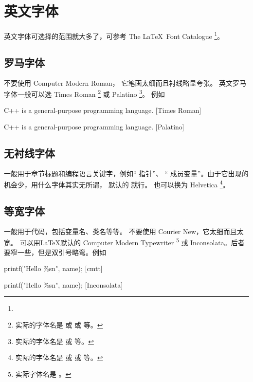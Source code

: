 \section{英文字体} %
英文字体可选择的范围就大多了，可参考
The \LaTeX\ Font Catalogue \footnote{}。

\subsection{罗马字体}
不要使用 {\selectfont Computer Modern Roman}，
它笔画太细而且衬线略显夸张。
英文罗马字体一般可以选 { Times Roman} 
\footnote{实际的字体名是  或  或  等。}
或 { Palatino}
\footnote{实际的字体名是  或  等。}。
例如
\begindot
\item { C++ is a general-purpose programming language. [Times Roman]}
\item { C++ is a general-purpose programming language. [Palatino]}
\myenddot

\subsection{无衬线字体}

一般用于章节标题和编程语言关键字，例如“ 指针”、
“ 成员变量”。由于它出现的机会少，用什么字体其实无所谓，
默认的  就行。
也可以换为 { Helvetica} 
\footnote{实际的字体名是  或  或  等。}。

\subsection{等宽字体}
一般用于代码，包括变量名、类名等等。
不要使用 { Courier New}，它太细而且太宽。
可以用\LaTeX 默认的 { Computer Modern Typewriter}
\footnote{实际字体名是 。} 
或 { Inconsolata}。后者要窄一些，但是双引号略弯。例如
\begindot
\item[] {\small {} printf("Hello \%s\bs n", name);} [cmtt]
\item[] {\small {} printf("Hello \%s\bs n", name);} [Inconsolata]
\myenddot

